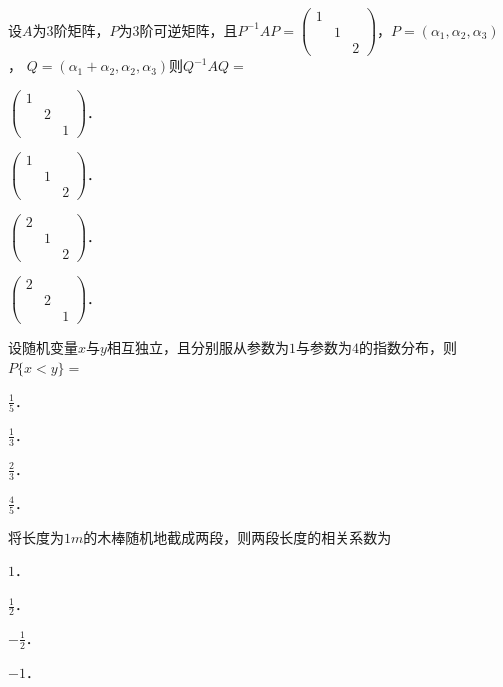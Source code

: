 \documentclass[plain,noanswer,medmath]{../../template/jnuexam}
\begin{document}
\begin{problem}
设$A$为$3$阶矩阵，$P$为$3$阶可逆矩阵，且$P^{-1}AP = \begin{pmatrix}
  1 &   & \\
    & 1 & \\
    &   & 2
\end{pmatrix}$，$P = \left(\alpha_1,\alpha_2,\alpha_3 \right)$，
$Q = \left(\alpha_1 + \alpha_2,\alpha_2,\alpha_3 \right)$则$Q^{-1}AQ=$\pickout{}
\begin{abcd}
\item $\begin{pmatrix}
  1 &   & \\
    & 2 & \\
    &   & 1
\end{pmatrix}$．
\item $\begin{pmatrix}
  1 &   & \\
    & 1 & \\
    &   & 2
\end{pmatrix}$．
\item $\begin{pmatrix}
  2 &   & \\
    & 1 & \\
    &   & 2
\end{pmatrix}$．
\item $\begin{pmatrix}
  2 &   & \\
    & 2 & \\
    &   & 1
\end{pmatrix}$．
\end{abcd}
\end{problem}


\begin{problem}
设随机变量$x$与$y$相互独立，且分别服从参数为$1$与参数为$4$的指数分布，则$P\{x < y\}=$\pickout{}
\begin{abcd}
\item $\frac{1}{5}$．
\item $\frac{1}{3}$．
\item $\frac{2}{3}$．
\item $\frac{4}{5}$．
\end{abcd}
\end{problem}


\begin{problem}
将长度为$1m$的木棒随机地截成两段，则两段长度的相关系数为\pickout{}
\begin{abcd}
\item $1$．
\item $\frac{1}{2}$．
\item $- \frac{1}{2}$．
\item $- 1$．
\end{abcd}
\end{problem}
\end{document}
